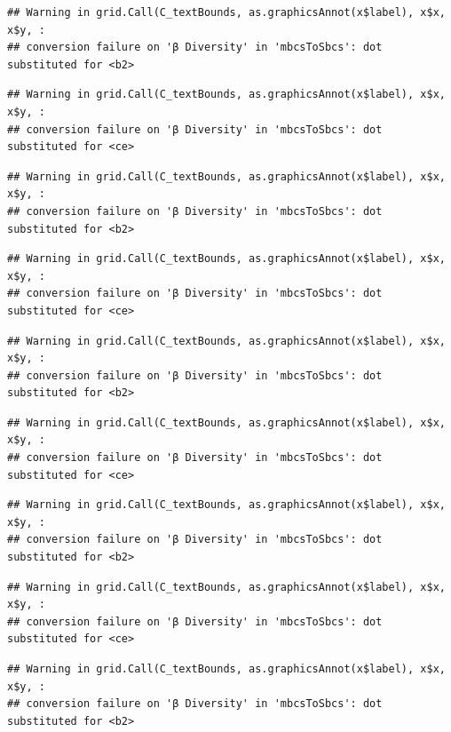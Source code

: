 \documentclass[
]{article}
\begin{document}
\begin{verbatim}
## Warning in grid.Call(C_textBounds, as.graphicsAnnot(x$label), x$x, x$y, :
## conversion failure on 'β Diversity' in 'mbcsToSbcs': dot substituted for <b2>
\end{verbatim}

\begin{verbatim}
## Warning in grid.Call(C_textBounds, as.graphicsAnnot(x$label), x$x, x$y, :
## conversion failure on 'β Diversity' in 'mbcsToSbcs': dot substituted for <ce>
\end{verbatim}

\begin{verbatim}
## Warning in grid.Call(C_textBounds, as.graphicsAnnot(x$label), x$x, x$y, :
## conversion failure on 'β Diversity' in 'mbcsToSbcs': dot substituted for <b2>
\end{verbatim}

\begin{verbatim}
## Warning in grid.Call(C_textBounds, as.graphicsAnnot(x$label), x$x, x$y, :
## conversion failure on 'β Diversity' in 'mbcsToSbcs': dot substituted for <ce>
\end{verbatim}

\begin{verbatim}
## Warning in grid.Call(C_textBounds, as.graphicsAnnot(x$label), x$x, x$y, :
## conversion failure on 'β Diversity' in 'mbcsToSbcs': dot substituted for <b2>
\end{verbatim}

\begin{verbatim}
## Warning in grid.Call(C_textBounds, as.graphicsAnnot(x$label), x$x, x$y, :
## conversion failure on 'β Diversity' in 'mbcsToSbcs': dot substituted for <ce>
\end{verbatim}

\begin{verbatim}
## Warning in grid.Call(C_textBounds, as.graphicsAnnot(x$label), x$x, x$y, :
## conversion failure on 'β Diversity' in 'mbcsToSbcs': dot substituted for <b2>
\end{verbatim}

\begin{verbatim}
## Warning in grid.Call(C_textBounds, as.graphicsAnnot(x$label), x$x, x$y, :
## conversion failure on 'β Diversity' in 'mbcsToSbcs': dot substituted for <ce>
\end{verbatim}

\begin{verbatim}
## Warning in grid.Call(C_textBounds, as.graphicsAnnot(x$label), x$x, x$y, :
## conversion failure on 'β Diversity' in 'mbcsToSbcs': dot substituted for <b2>
\end{verbatim}
\end{document}
